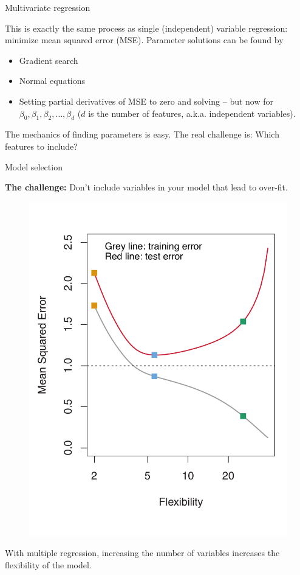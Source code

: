 \documentclass[aspectratio=169]{beamer}
\begin{document}
\begin{frame}{Multivariate regression}

This is exactly the same process as single (independent) variable regression: minimize mean squared error (MSE).  Parameter solutions can be found by
\begin{itemize}
\item Gradient search
\item Normal equations
\item Setting partial derivatives of MSE to zero and solving -- but now for $\beta_0, \beta_1, \beta_2,\ldots,\beta_d$ ($d$ is the number of features, a.k.a. independent variables).
\end{itemize}

\vspace{5mm}
The mechanics of finding parameters is easy.  The real challenge is: Which features to include?
\end{frame}

\begin{frame}{Model selection}

\textbf{The challenge:} Don't include variables in your model that lead to over-fit.

\vspace{-5mm}

\begin{figure}
\includegraphics[height=0.8\textheight]{islr2_9b}
\end{figure}

\vspace{-10mm}
With multiple regression, increasing the number of variables increases the flexibility of the model.

\end{frame}
\end{document}
